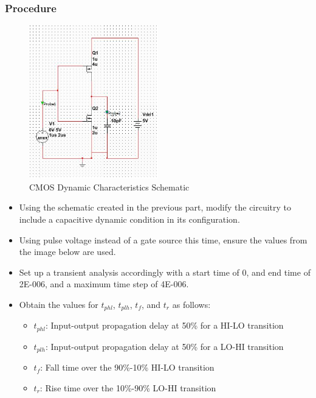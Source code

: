 \documentclass[12pt]{article}
\begin{document}
\subsubsection{Procedure}
\begin{figure}[H]
\centering
\includegraphics[width=0.5\textwidth]{6.jpg}
\caption{CMOS Dynamic Characteristics Schematic}
\end{figure}
\begin{itemize}
\item Using the schematic created in the previous part, modify the circuitry to include a capacitive dynamic condition in its configuration.
\item Using pulse voltage instead of a gate source this time, ensure the values from the image below are used.
\item Set up a transient analysis accordingly with a start time of 0, and end time of 2E-006, and a maximum time step of 4E-006.
\item Obtain the values for $t_{phl}$, $t_{plh}$, $t_f$, and $t_r$ as follows:
\begin{itemize}
\item $t_{phl}$: Input-output propagation delay at 50\% for a HI-LO transition
\item $t_{plh}$: Input-output propagation delay at 50\% for a LO-HI transition
\item $t_f$: Fall time over the 90\%-10\% HI-LO transition
\item $t_r$: Rise time over the 10\%-90\% LO-HI transition
\end{itemize}
\end{itemize}
\end{document}
